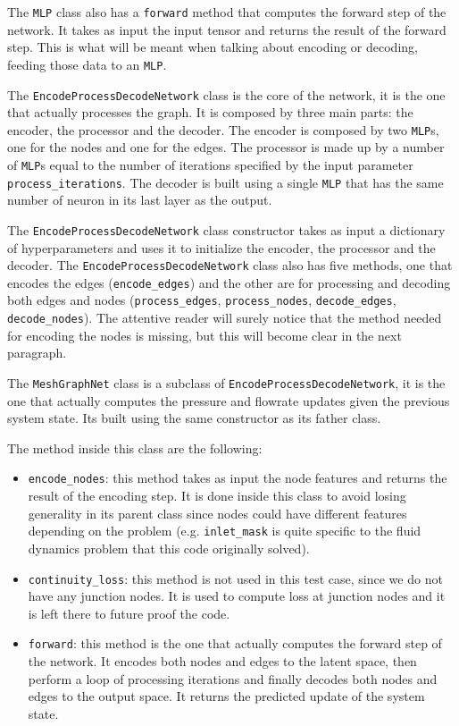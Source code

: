 \documentclass[11pt,a4paper]{article}
\begin{document}
The \texttt{MLP} class also has a \texttt{forward} method that computes the forward step of the network. It takes as input the input tensor and returns the result of the forward step. This is what will be meant when talking about encoding or decoding, feeding those data to an \texttt{MLP}.


The \texttt{EncodeProcessDecodeNetwork} class is the core of the network, it is the one that actually processes the graph. It is composed by three main parts: the encoder, the processor and the decoder. The encoder is composed by two \texttt{MLP}s, one for the nodes and one for the edges. The processor is made up by a number of \texttt{MLP}s equal to the number of iterations specified by the input parameter \texttt{process\_iterations}. The decoder is built using a single \texttt{MLP} that has the same number of neuron in its last layer as the output.

The \texttt{EncodeProcessDecodeNetwork} class constructor takes as input a dictionary of hyperparameters and uses it to initialize the encoder, the processor and the decoder. 
The \texttt{EncodeProcessDecodeNetwork} class also has five methods, one that encodes the edges (\texttt{encode\_edges}) and the other are for processing and decoding both edges and nodes (\texttt{process\_edges}, \texttt{process\_nodes}, \texttt{decode\_edges}, \texttt{decode\_nodes}). The attentive reader will surely notice that the method needed for encoding the nodes is missing, but this will become clear in the next paragraph.


The \texttt{MeshGraphNet} class is a subclass of \texttt{EncodeProcessDecodeNetwork}, it is the one that actually computes the pressure and flowrate updates given the previous system state. Its built using the same constructor as its father class. 

The method inside this class are the following:
\begin{itemize}
    \item \texttt{encode\_nodes}: this method takes as input the node features and returns the result of the encoding step. It is done inside this class to avoid losing generality in its parent class since nodes could have different features depending on the problem (e.g. \texttt{inlet\_mask} is quite specific to the fluid dynamics problem that this code originally solved).
    \item \texttt{continuity\_loss}: this method is not used in this test case, since we do not have any junction nodes. It is used to compute loss at junction nodes and it is left there to future proof the code.
    \item \texttt{forward}: this method is the one that actually computes the forward step of the network. It encodes both nodes and edges to the latent space, then perform a loop of processing iterations and finally decodes both nodes and edges to the output space. It returns the predicted update of the system state.
\end{itemize}
\end{document}
